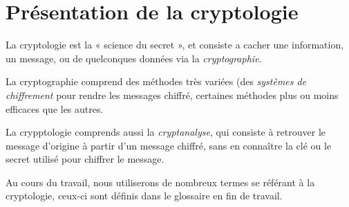 \section{Présentation de la cryptologie}
La cryptologie est la « science du secret », et consiste a cacher une
information, un message, ou de quelconques données via la
\emph{cryptographie}. 

La cryptographie comprend des méthodes très variées (des
\emph{systèmes de chiffrement} pour rendre les messages chiffré,
certaines méthodes plus ou moins efficaces que les autres.

La crypptologie comprends aussi la \emph{cryptanalyse}, qui consiste à
retrouver le message d'origine à partir d'un message chiffré, sans en
connaître la clé ou le secret utilisé pour chiffrer le message.

Au cours du travail, nous utiliserons de nombreux termes se référant à
la cryptologie, ceux-ci sont définis dans le glossaire en fin de travail.